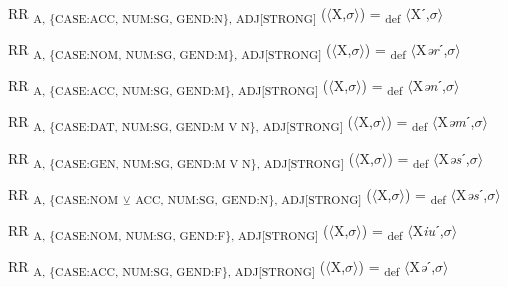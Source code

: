 {\begin{exe}
 RR \textsubscript{A, \{CASE:ACC, NUM:SG, GEND:N\}, ADJ[STRONG]} ($\langle$X,$\sigma $$\rangle$) = \textsubscript{def} $\langle$Xˊ,$\sigma $$\rangle$
\end{exe}

\begin{exe}
 RR \textsubscript{A, \{CASE:NOM, NUM:SG, GEND:M\}, ADJ[STRONG]} ($\langle$X,$\sigma $$\rangle$) = \textsubscript{def} $\langle$X\textit{ər}ˊ,$\sigma $$\rangle$
\end{exe}

\begin{exe}
 RR \textsubscript{A, \{CASE:ACC, NUM:SG, GEND:M\}, ADJ[STRONG]} ($\langle$X,$\sigma $$\rangle$) = \textsubscript{def} $\langle$X\textit{ən}ˊ,$\sigma $$\rangle$
\end{exe}

\begin{exe}
 RR \textsubscript{A, \{CASE:DAT, NUM:SG, GEND:M V N\}, ADJ[STRONG]} ($\langle$X,$\sigma $$\rangle$) = \textsubscript{def} $\langle$X\textit{əm}ˊ,$\sigma $$\rangle$
\end{exe}

\begin{exe}
 RR \textsubscript{A, \{CASE:GEN, NUM:SG, GEND:M V N\}, ADJ[STRONG]} ($\langle$X,$\sigma $$\rangle$) = \textsubscript{def} $\langle$X\textit{əs}ˊ,$\sigma $$\rangle$
\end{exe}

\begin{exe}
 RR \textsubscript{A, \{CASE:NOM} \textsubscript{${\veebar}$}\textsubscript{ ACC, NUM:SG, GEND:N\}, ADJ[STRONG]} ($\langle$X,$\sigma $$\rangle$) = \textsubscript{def} $\langle$X\textit{əs}ˊ,$\sigma $$\rangle$
\end{exe}

\begin{exe}
 RR \textsubscript{A, \{CASE:NOM, NUM:SG, GEND:F\}, ADJ[STRONG]} ($\langle$X,$\sigma $$\rangle$) = \textsubscript{def} $\langle$X\textit{iu}ˊ,$\sigma $$\rangle$
\end{exe}

\begin{exe}
 RR \textsubscript{A, \{CASE:ACC, NUM:SG, GEND:F\}, ADJ[STRONG]} ($\langle$X,$\sigma $$\rangle$) = \textsubscript{def} $\langle$X\textit{ə}ˊ,$\sigma $$\rangle$
\end{exe}

}
